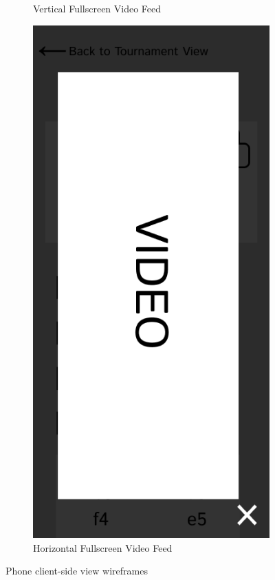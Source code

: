 \begin{figure}[h!]
\begin{subfigure}[h!]{0.2\linewidth}
        \caption{Vertical Fullscreen Video Feed}
        \label{fig:phone-fullscreen-video-vertical}
    \end{subfigure}
    \hfill
    \begin{subfigure}[h!]{0.2\linewidth}
        \centering
        \includegraphics[width=\linewidth]{figures/methods/wireframes/phone-full-screen-video-view-horizontal.png}
        \caption{Horizontal Fullscreen Video Feed}
        \label{fig:phone-fullscreen-video-horizontal}
    \end{subfigure}
    
    \caption{Phone client-side view wireframes}
    \label{fig:phone-view-group}
\end{figure}

